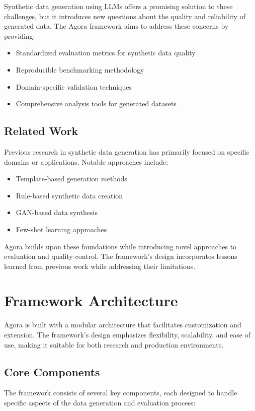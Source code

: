 \documentclass[10pt,conference]{IEEEtran}
\begin{document}
Synthetic data generation using LLMs offers a promising solution to these challenges, but it introduces new questions about the quality and reliability of generated data. The Agora framework aims to address these concerns by providing:
\begin{itemize}
    \item Standardized evaluation metrics for synthetic data quality
    \item Reproducible benchmarking methodology
    \item Domain-specific validation techniques
    \item Comprehensive analysis tools for generated datasets
\end{itemize}

\subsection{Related Work}
Previous research in synthetic data generation has primarily focused on specific domains or applications. Notable approaches include:
\begin{itemize}
    \item Template-based generation methods
    \item Rule-based synthetic data creation
    \item GAN-based data synthesis
    \item Few-shot learning approaches
\end{itemize}

Agora builds upon these foundations while introducing novel approaches to evaluation and quality control. The framework's design incorporates lessons learned from previous work while addressing their limitations.

\section{Framework Architecture}
Agora is built with a modular architecture that facilitates customization and extension. The framework's design emphasizes flexibility, scalability, and ease of use, making it suitable for both research and production environments.

\subsection{Core Components}
The framework consists of several key components, each designed to handle specific aspects of the data generation and evaluation process:
\end{document}
